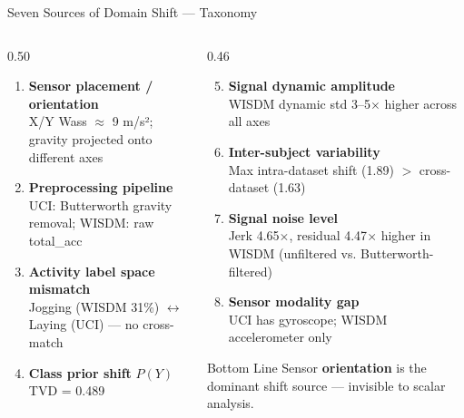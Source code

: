 \documentclass[aspectratio=169, 10pt]{beamer}
\begin{document}
\begin{frame}{Seven Sources of Domain Shift — Taxonomy}
  \begin{columns}[T]
    \begin{column}{0.50\textwidth}
      \begin{enumerate}
        \item \textbf{Sensor placement / orientation} \\
              \small X/Y Wass $\approx$ 9 m/s²; gravity projected onto different axes
        \vspace{1mm}
        \item \textbf{Preprocessing pipeline} \\
              \small UCI: Butterworth gravity removal; WISDM: raw total\_acc
        \vspace{1mm}
        \item \textbf{Activity label space mismatch} \\
              \small Jogging (WISDM 31\%) $\leftrightarrow$ Laying (UCI) — no cross-match
        \vspace{1mm}
        \item \textbf{Class prior shift} $P(Y)$ \\
              \small TVD = 0.489
      \end{enumerate}
    \end{column}
    \begin{column}{0.46\textwidth}
      \begin{enumerate}
        \setcounter{enumi}{4}
        \item \textbf{Signal dynamic amplitude} \\
              \small WISDM dynamic std 3--5$\times$ higher across all axes
        \vspace{1mm}
        \item \textbf{Inter-subject variability} \\
              \small Max intra-dataset shift (1.89) $>$ cross-dataset (1.63)
        \vspace{1mm}
        \item \textbf{Signal noise level} \\
              \small Jerk 4.65$\times$, residual 4.47$\times$ higher in WISDM (unfiltered vs. Butterworth-filtered)
        \item \textbf{Sensor modality gap} \\
              \small UCI has gyroscope; WISDM accelerometer only
      \end{enumerate}

      \vspace{4mm}
      \begin{alertblock}{Bottom Line}
        \small Sensor \textbf{orientation} is the dominant shift source — invisible to scalar analysis.
      \end{alertblock}
    \end{column}
  \end{columns}
\end{frame}
\end{document}
